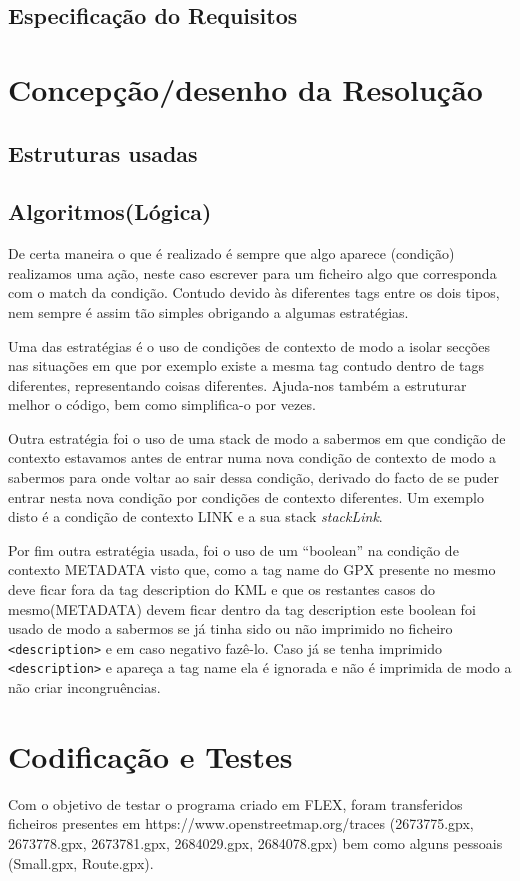 \documentclass{llncs}
\begin{document}
\subsection{Especificação do Requisitos}

\section{Concepção/desenho da Resolução}

\subsection{Estruturas usadas}

\subsection{Algoritmos(Lógica)}
De certa maneira o que é realizado é sempre que algo aparece (condição) realizamos uma ação, neste caso escrever para um ficheiro algo que corresponda com o match da condição. Contudo devido às diferentes tags entre os dois tipos, nem sempre é assim tão simples obrigando a algumas estratégias.

Uma das estratégias é o uso de condições de contexto de modo a isolar secções nas situações em que por exemplo existe a mesma tag contudo dentro de tags diferentes, representando coisas diferentes. Ajuda-nos também a estruturar melhor o código, bem como simplifica-o por vezes.

Outra estratégia foi o uso de uma stack de modo a sabermos em que condição de contexto estavamos antes de entrar numa nova condição de contexto de modo a sabermos para onde voltar ao sair dessa condição, derivado do facto de se puder entrar nesta nova condição por condições de contexto diferentes. Um exemplo disto é a condição de contexto LINK e a sua stack \textit{stackLink}.

Por fim outra estratégia usada, foi o uso de um ``boolean'' na condição de contexto METADATA visto que, como a tag name do GPX presente no mesmo deve ficar fora da tag description do KML e que os restantes casos do mesmo(METADATA) devem ficar dentro da tag description este boolean foi usado de modo a sabermos se já tinha sido ou não imprimido no ficheiro \verb|<description>| e em caso negativo fazê-lo. Caso já se tenha imprimido \verb|<description>| e apareça a tag name ela é ignorada e não é imprimida de modo a não criar incongruências.

\section{Codificação e Testes}
Com o objetivo de testar o programa criado em FLEX, foram transferidos ficheiros presentes em https://www.openstreetmap.org/traces (2673775.gpx, 2673778.gpx, 2673781.gpx, 2684029.gpx, 2684078.gpx) bem como alguns pessoais (Small.gpx, Route.gpx).
\end{document}

